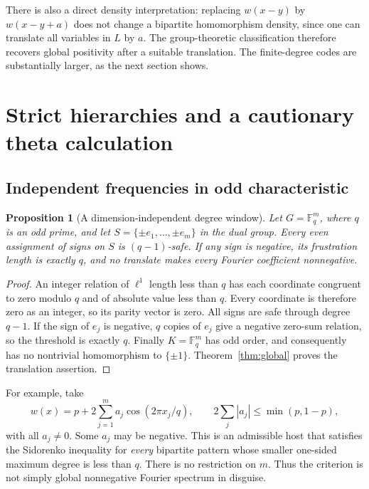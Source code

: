 \documentclass[11pt]{article}
\numberwithin{equation}{section}
\newtheorem{proposition}[theorem]{Proposition}
\theoremstyle{definition}
\theoremstyle{remark}
\newcommand{\F}{\mathbb F}
\begin{document}
There is also a direct density interpretation: replacing $w(x-y)$ by
$w(x-y+a)$ does not change a bipartite homomorphism density, since one
can translate all variables in $L$ by $a$. The group-theoretic
classification therefore recovers global positivity after a suitable
translation. The finite-degree codes are substantially larger, as the
next section shows.

\section{Strict hierarchies and a cautionary theta calculation}
\label{sec:examples}

\subsection{Independent frequencies in odd characteristic}

\begin{proposition}[A dimension-independent degree window]
\label{prop:odd-spectrum}
Let $G=\F_q^m$, where $q$ is an odd prime, and let
$S=\{\pm e_1,\ldots,\pm e_m\}$ in the dual group. Every even assignment
of signs on $S$ is $(q-1)$-safe. If any sign is negative, its frustration
length is exactly $q$, and no translate makes every Fourier coefficient
nonnegative.
\end{proposition}
\begin{proof}
An integer relation of $\ell^1$ length less than $q$ has each coordinate
congruent to zero modulo $q$ and of absolute value less than $q$. Every
coordinate is therefore zero as an integer, so its parity vector is zero.
All signs are safe through degree $q-1$. If the sign of $e_j$ is negative,
$q$ copies of $e_j$ give a negative zero-sum relation, so the threshold is
exactly $q$. Finally $K=\F_q^m$ has odd order, and consequently has no
nontrivial homomorphism to $\{\pm1\}$. Theorem~\ref{thm:global} proves
the translation assertion.
\end{proof}

For example, take
\begin{equation}
 w(x)=p+2\sum_{j=1}^m a_j\cos(2\pi x_j/q),
 \qquad
 2\sum_j|a_j|\leq\min(p,1-p),
 \label{eq:odd-example}
\end{equation}
with all $a_j\ne0$. Some $a_j$ may be negative. This is an admissible
host that satisfies the Sidorenko inequality for \emph{every} bipartite
pattern whose smaller one-sided maximum degree is less than $q$.
There is no restriction on $m$. Thus the criterion is not simply global
nonnegative Fourier spectrum in disguise.
\end{document}
